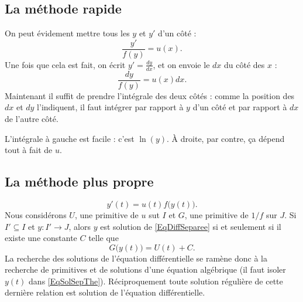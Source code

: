 \subsection{La méthode rapide}

On peut évidement mettre tous les $y$ et $y'$ d'un côté :
\begin{equation}
	\frac{ y' }{ f(y) }=u(x).
\end{equation}
Une fois que cela est fait, on écrit $y'=\frac{ dy }{ dx }$, et on envoie le $dx$ du côté des $x$ :
\begin{equation}
	\frac{ dy }{ f(y) }=u(x)dx.
\end{equation}
Maintenant il suffit de prendre l'intégrale des deux côtés : comme la position des $dx$ et $dy$ l'indiquent, il faut intégrer par rapport à $y$ d'un côté et par rapport à $dx$ de l'autre côté.

L'intégrale à gauche est facile : c'est $\ln(y)$. À droite, par contre, ça dépend tout à fait de $u$.

\subsection{La méthode plus propre}

\begin{equation}
	y'(t)=u(t)f\big( y(t) \big).
\end{equation}
Nous considérons $U$, une primitive de $u$ sut $I$ et $G$, une primitive de $1/f$ sur $J$. Si $I'\subseteq I$ et $y\colon I'\to J$, alors $y$ est solution de \eqref{EqDiffSeparee} si et seulement si il existe une constante $C$ telle que
\begin{equation}		\label{EqSolSepThe}
	G\big( y(t) \big)=U(t)+C.
\end{equation}
La recherche des solutions de l'équation différentielle se ramène donc à la recherche de primitives et de solutions d'une équation algébrique (il faut isoler $y(t)$ dans \eqref{EqSolSepThe}). Réciproquement toute solution régulière de cette dernière relation est solution de l'équation différentielle.

